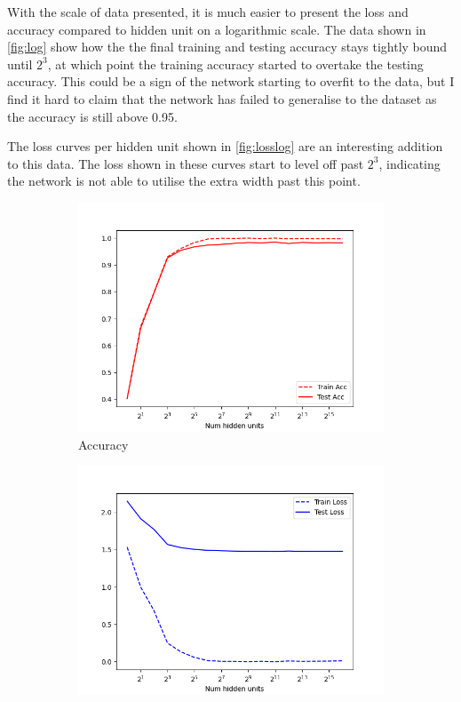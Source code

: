 \documentclass[sigconf]{acmart}
\begin{document}
With the scale of data presented, it is much easier to present the loss and accuracy compared to hidden unit on a logarithmic scale.
The data shown in \autoref{fig:log} show how the the final training and testing accuracy stays tightly bound until $2^{3}$, at which point the training accuracy started to overtake the testing accuracy.
This could be a sign of the network starting to overfit to the data, but I find it hard to claim that the network has failed to generalise to the dataset as the accuracy is still above 0.95.

The loss curves per hidden unit shown in \autoref{fig:losslog} are an interesting addition to this data. The loss shown in these curves start to level off past $2^{3}$, indicating the network is not able to utilise the extra width past this point.
\begin{figure}
    \centering
    \begin{subfigure}{.25\textwidth}
      \centering
      \includegraphics[width=\linewidth]{../acclog.png}
      \caption{Accuracy}
      \label{fig:acclog}
    \end{subfigure}%
    \begin{subfigure}{.25\textwidth}
      \centering
      \includegraphics[width=\linewidth]{../losslog.png}

\end{subfigure}
\end{figure}
\end{document}
